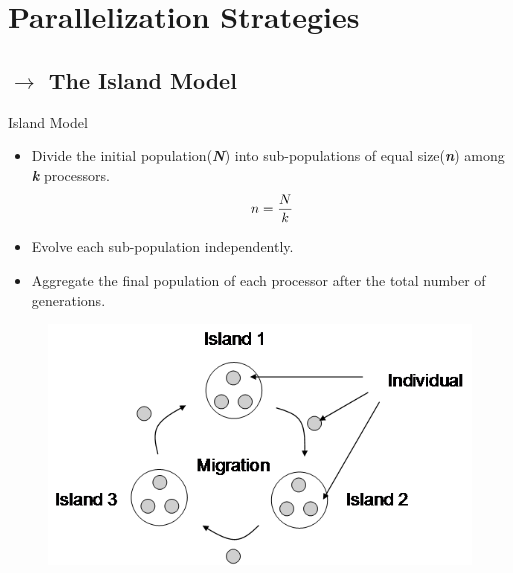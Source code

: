 \documentclass[10pt]{beamer}
\begin{document}
\section{Parallelization Strategies}
\subsection{$\rightarrow$ The Island Model}
\begin{frame}{Island Model}
    \begin{minipage}{0.48\linewidth}
        \begin{itemize}
            \item<1-> Divide the initial population(\textbf{\textit{N}}) into sub-populations of equal size(\textbf{\textit{n}}) among \textbf{\textit{k}} processors.
            \[ n = {N \over k}\]
            \item<2-> Evolve each sub-population independently.
            \item<3-> Aggregate the final population of each processor after the total number of generations.
        \end{itemize}
    \end{minipage}
    \begin{minipage}{0.5\linewidth}
        \begin{figure}
            \centering
            \includegraphics[scale=0.25]{figures/island}
            \label{fig:island}
        \end{figure}
    \end{minipage}
\end{frame}
\end{document}
